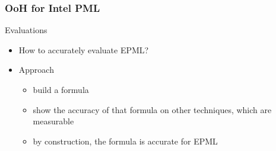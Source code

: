 \documentclass[xcolor=table,bigger,unknownkeysallowed]{beamer}
\begin{document}
\begin{frame}
        \end{frame}  
        \begin{frame}
                \frametitle{OoH for Intel PML}			
			\begin{block}{Evaluations}
				\begin{itemize}
					\item How to accurately evaluate EPML?
					\item Approach
					\begin{itemize}
						\item build a formula
						\item show the accuracy of that formula on other techniques, which are measurable
						\item by construction, the formula is accurate for EPML
					\end{itemize}
				\end{itemize}
			\end{block} 
        \end{frame} 
\end{document}
